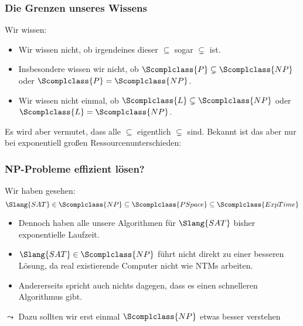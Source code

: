\documentclass[aspectratio=1610,onlymath]{beamer}
\begin{document}
\begin{frame}\frametitle{Die Grenzen unseres Wissens}

Wir wissen:

\theobox{
\[\Scomplclass{L}\subseteq\Scomplclass{NL}\subseteq \Scomplclass{P}\subseteq\Scomplclass{NP}\subseteq\Scomplclass{PSpace}= \Scomplclass{NPSpace}\subseteq \Scomplclass{Exp}\subseteq \Scomplclass{NExp}\]
\vspace{-2.5ex}
}

\begin{itemize}
\item Wir wissen nicht, ob irgendeines dieser $\subseteq$ sogar $\subsetneq$ ist.
\item Insbesondere wissen wir nicht, ob $\Scomplclass{P}\subsetneq\Scomplclass{NP}$ oder $\Scomplclass{P}=\Scomplclass{NP}$.
\item Wir wissen nicht einmal, ob $\Scomplclass{L}\subsetneq\Scomplclass{NP}$ oder $\Scomplclass{L}=\Scomplclass{NP}$.
\end{itemize}\pause
Es wird aber vermutet, dass alle  $\subseteq$ eigentlich $\subsetneq$ sind.
% 
Bekannt ist das aber nur bei exponentiell großen Ressourcenunterschieden:


\end{frame}



\begin{frame}\frametitle{NP-Probleme effizient lösen?}

Wir haben gesehen:
\[ \Slang{SAT}\in\Scomplclass{NP}\subseteq\Scomplclass{PSpace}\subseteq\Scomplclass{ExpTime}\]

\begin{itemize}
\item Dennoch haben alle unsere Algorithmen für $\Slang{SAT}$ bisher 
exponentielle Laufzeit.
\item $\Slang{SAT}\in\Scomplclass{NP}$ führt nicht direkt zu einer besseren Lösung, da real existierende Computer nicht wie NTMs arbeiten.
\item Andererseits spricht auch nichts dagegen, dass es einen schnelleren Algorithmus gibt.
\end{itemize}

$\leadsto$ Dazu sollten wir erst einmal $\Scomplclass{NP}$ etwas besser verstehen

\end{frame}
\end{document}
